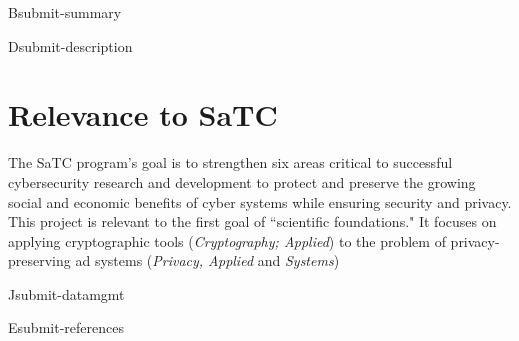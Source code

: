 \documentclass[11pt]{article}
\newcommand{\proptitle}{Privacy-Preserving Ad Economy for the Web}
\newcommand{\authoraffil}{Anna Lysyanskaya and Malte Schwarzkopf, Computer Science Department, Brown University}
\begin{document}
\pagestyle{plain}

\begin{submit}{B}{submit-summary}

\end{submit}


\begin{submit}{D}{submit-description}



%

%




\section{Relevance to SaTC}
The SaTC program's goal is to strengthen six areas critical to successful cybersecurity research and development to protect and preserve the growing social and economic benefits of cyber systems while ensuring security and privacy. This project is relevant to the first goal of ``scientific foundations."  It focuses on applying cryptographic tools (\textit{Cryptography; Applied}) to the problem of privacy-preserving ad systems (\textit{Privacy, Applied} and \textit{Systems})

\end{submit}

%

\begin{submit}{J}{submit-datamgmt}

\end{submit}

%

%

%

\begin{submit}{E}{submit-references}
{

\renewcommand{\refname}{{E}\quad References Cited}
\raggedright
%
%
\printbibliography

}
\end{submit}
\end{document}
